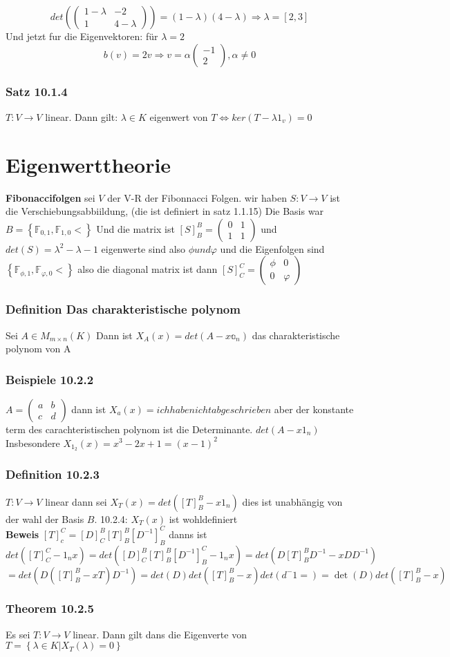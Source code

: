 \documentclass{article}
\newcommand{\satz}[1]{\subsubsection*{Satz {#1}}}
\newcommand{\beweis}{\\\textbf{Beweis }}
\newcommand{\beispiel}[1]{\subsubsection*{Beispiele {#1}}}
\newcommand{\theorem}[1]{\subsubsection*{Theorem {#1}}}
\newcommand{\definition}[1]{\subsubsection*{Definition {#1}}}
\begin{document}
\begin{itemize}
{ \[det\left(\begin{pmatrix}1-\lambda&-2\\1&4-\lambda\end{pmatrix}\right)=(1-\lambda)(4-\lambda)\Rightarrow \lambda =[2,3]\]
 Und jetzt fur die Eigenvektoren: für $\lambda = 2$
 \[b(v)=2v\Rightarrow v=\alpha\begin{pmatrix}-1\\2\end{pmatrix}, \alpha\neq0\]}
\end{itemize}
\satz{10.1.4} $T:V\rightarrow V$ linear. Dann gilt: $\lambda \in K$ eigenwert von $T\Leftrightarrow ker(T-\lambda1_v)=0$

\section*{Eigenwerttheorie}
\textbf{Fibonaccifolgen} sei $V$ der V-R der Fibonnacci Folgen. wir haben $S:V\rightarrow V$ ist die Verschiebungsabbiildung, (die ist definiert in satz 1.1.15) Die Basis war $B=\left\lbrace\mathbb{F}_{0,1}, \mathbb{F}_{1,0}<\right\rbrace$
Und die matrix ist $[S]^B_B=\begin{pmatrix}0&1\\1&1\end{pmatrix}$ und $det(S)=\lambda^2-\lambda-1$ eigenwerte sind also $\phi und \varphi$ und die Eigenfolgen sind $\left\lbrace\mathbb{F}_{\phi,1}, \mathbb{F}_{\varphi,0}<\right\rbrace$ also die diagonal matrix ist dann $[S]^C_C=\begin{pmatrix}\phi&0\\0&\varphi\end{pmatrix}$
\definition{Das charakteristische polynom} Sei $A\in M_{m\times n}(K)$ Dann ist $X_A(x)=det(A-x\mathbb{a}_n)$ das charakteristische polynom von A
\beispiel{10.2.2} $A=\begin{pmatrix}a&b\\c&d\end{pmatrix}$ dann ist $X_a(x)=ichhabe nicht abgeschrieben$ aber der konstante term des carachteristischen polynom ist die Determinante.
$det(A-x1_n)$ Insbesondere $X_{1_2}(x)=x^3-2x+1=(x-1)^2$ 

\definition{10.2.3} $T:V\rightarrow V$ linear dann sei $X_T(x)=det([T]_B^B-x1_n)$ dies ist unabhängig von der wahl der Basis $B$. 10.2.4: $X_T(x)$ ist wohldefiniert\beweis $[T]_c^C=[D]^B_C[T]_B^B[D^{-1}]^C_B$ danns ist \[det([T]_C^C-1_nx) =det([D]^B_C[T]_B^B[D^{-1}]^C_B-1_nx)=det(D[T]^B_BD^{-1}-xDD^{-1})\]\[=det(D([T]^B_B-xT)D^{-1})=det(D)det([T]^B_B-x)det(d^-1=)=\det(D)det([T]^B_B-x)\]
\theorem{10.2.5} Es sei $T:V\rightarrow V$ linear. Dann gilt dans die Eigenverte von $T=\left\lbrace\lambda \in K|X_T(\lambda)=0\right\rbrace$
\end{document}
